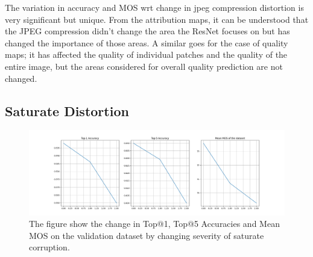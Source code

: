 \documentclass[10pt,twocolumn,letterpaper]{article}
\begin{document}
The variation in accuracy and MOS wrt change in jpeg compression distortion is very significant but unique. From the attribution maps, it can be understood that the JPEG compression didn't change the area the ResNet focuses on but has changed the importance of those areas. A similar goes for the case of quality maps; it has affected the quality of individual patches and the quality of the entire image, but the areas considered for overall quality prediction are not changed.

\subsection{Saturate Distortion}
\begin{figure}[!ht]
	\centering
	\includegraphics[width=1.\columnwidth]{Images/saturate.png}
	\caption{The figure show the change in Top@1, Top@5 Accuracies and Mean MOS on the validation dataset by changing severity of saturate corruption.}
\end{figure}
\end{document}
